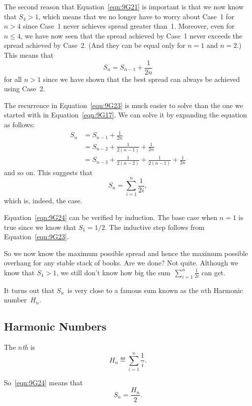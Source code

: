 The second reason that Equation~\ref{eqn:9G21} is important is that we
now know that $S_4 > 1$, which means that we no longer have to worry
about Case~1 for $n > 4$ since Case~1 never achieves spread greater
than~1.  Moreover, even for~$n \le 4$, we have now seen that the
spread achieved by Case~1 never exceeds the spread achieved by
Case~2.  (And they can be equal only for $n = 1$ and $n = 2$.)  This
means that
\begin{equation}\label{eqn:9G23}
    S_n = S_{n - 1} + \frac{1}{2n}
\end{equation}
for all $n > 1$ since we have shown that the best spread can always be
achieved using Case~2.

The recurrence in Equation~\ref{eqn:9G23} is much easier to solve than
the one we started with in Equation~\ref{eqn:9G17}.  We can solve it
by expanding the equation as follows:
\begin{align*}
S_n &= S_{n - 1} + \frac{1}{2n} \\
    &= S_{n - 2} + \frac{1}{2(n - 1)} + \frac{1}{2n} \\
    &= S_{n - 3} + \frac{1}{2(n - 2)} + \frac{1}{2(n - 1)} + \frac{1}{2n}
\end{align*}
and so on.  This suggests that
\begin{equation}\label{eqn:9G24}
    S_n = \sum_{i = 1}^n \frac{1}{2i},
\end{equation}
which is, indeed, the case.

Equation~\ref{eqn:9G24} can be verified by induction.  The base case
when $n = 1$ is true since we know that $S_1 = 1/2$.  The inductive
step follows from Equation~\ref{eqn:9G23}.

So we now know the maximum possible spread and hence the maximum
possible overhang for any stable stack of books.  Are we done?  Not
quite.  Although we know that $S_4 > 1$, we still don't know how big
the sum~$\sum_{i = 1}^n \frac{1}{2i}$ can get.

It turns out that $S_n$~is very close to a famous sum known as the
$n$th Harmonic number~$H_n$.

\subsection{Harmonic Numbers}

\begin{definition}
The \emph{$n$th}  is
\[
    H_n \eqdef \sum_{i=1}^n \frac{1}{i}.
\]
\end{definition}
So~\eqref{eqn:9G24} means that
\begin{equation}\label{eqn:9G25}
    S_n = \frac{H_n}{2}.
\end{equation}

